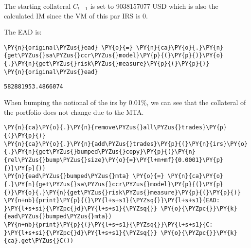     The starting collateral \(C_{t-1}\) is set to 9038157077 USD which is
also the calculated IM since the VM of this par IRS is 0.

    
    The EAD is:

    \begin{tcolorbox}[breakable, size=fbox, boxrule=1pt, pad at break*=1mm,colback=cellbackground, colframe=cellborder]
\begin{Verbatim}[commandchars=\\\{\}]
\PY{n}{original\PYZus{}ead} \PY{o}{=} \PY{n}{ca}\PY{o}{.}\PY{n}{get\PYZus{}sa\PYZus{}ccr\PYZus{}model}\PY{p}{(}\PY{p}{)}\PY{o}{.}\PY{n}{get\PYZus{}risk\PYZus{}measure}\PY{p}{(}\PY{p}{)}
\PY{n}{original\PYZus{}ead}
\end{Verbatim}
\end{tcolorbox}

            \begin{tcolorbox}[breakable, size=fbox, boxrule=.5pt, pad at break*=1mm, opacityfill=0]
\begin{Verbatim}[commandchars=\\\{\}]
582881953.4866074
\end{Verbatim}
\end{tcolorbox}
        
    When bumping the notional of the irs by 0.01\%, we can see that the
collateral of the portfolio does not change due to the MTA.

    \begin{tcolorbox}[breakable, size=fbox, boxrule=1pt, pad at break*=1mm,colback=cellbackground, colframe=cellborder]
\begin{Verbatim}[commandchars=\\\{\}]
\PY{n}{ca}\PY{o}{.}\PY{n}{remove\PYZus{}all\PYZus{}trades}\PY{p}{(}\PY{p}{)}
\PY{n}{ca}\PY{o}{.}\PY{n}{add\PYZus{}trades}\PY{p}{(}\PY{n}{irs}\PY{o}{.}\PY{n}{get\PYZus{}bumped\PYZus{}copy}\PY{p}{(}\PY{n}{rel\PYZus{}bump\PYZus{}size}\PY{o}{=}\PY{l+m+mf}{0.0001}\PY{p}{)}\PY{p}{)}
\PY{n}{ead\PYZus{}bumped\PYZus{}mta} \PY{o}{=} \PY{n}{ca}\PY{o}{.}\PY{n}{get\PYZus{}sa\PYZus{}ccr\PYZus{}model}\PY{p}{(}\PY{p}{)}\PY{o}{.}\PY{n}{get\PYZus{}risk\PYZus{}measure}\PY{p}{(}\PY{p}{)}
\PY{n+nb}{print}\PY{p}{(}\PY{l+s+s1}{\PYZsq{}}\PY{l+s+s1}{EAD:  }\PY{l+s+si}{\PYZpc{}d}\PY{l+s+s1}{\PYZsq{}} \PY{o}{\PYZpc{}}\PY{k}{ead\PYZus{}bumped\PYZus{}mta})
\PY{n+nb}{print}\PY{p}{(}\PY{l+s+s1}{\PYZsq{}}\PY{l+s+s1}{C:   }\PY{l+s+si}{\PYZpc{}d}\PY{l+s+s1}{\PYZsq{}} \PY{o}{\PYZpc{}}\PY{k}{ca}.get\PYZus{}C())
\end{Verbatim}
\end{tcolorbox}


